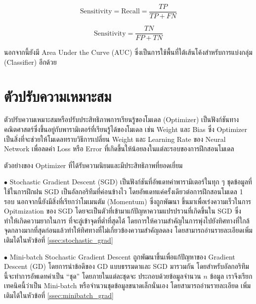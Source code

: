 \begin{equation}
    \text{Sensitivity} = \text{Recall} = \frac{TP}{TP+FN}
\end{equation}

\begin{equation}
    \text{Sensitivity} = \frac{TN}{FP+TN}
\end{equation}

\noindent นอกจากนี้ยังมี Area Under the Curve (AUC) ซึ่งเป็นการใช้พื้นที่ใต้เส้นโค้งสำหรับการแบ่งกลุ่ม (Classifier) อีกด้วย

\section{ตัวปรับความเหมาะสม}
\label{sec:optimizer}

ตัวปรับความเหมาะสมหรือปรับประสิทธิภาพการเรียนรู้ของโมเดล (Optimizer) เป็นฟังก์ชันทางคณิตศาสตร์ซึ่งขึ้นอยู่กับพารามิเตอร์ที่เรียนรู้ได้ของโมเดล 
เช่น Weight และ Bias ซึ่ง Optimizer เป็นสิ่งที่จะช่วยให้โมเดลทราบวิธีการเปลี่ยน Weight และ Learning Rate ของ Neural Network 
เพื่อลดค่า Loss หรือ Error ที่เกิดขึ้นให้น้อยลงในแต่ละรอบของการฝึกสอนโมเดล

\noindent ตัวอย่างของ Optimizer ที่ได้รับความนิยมและมีประสิทธิภาพที่ยอดเยี่ยม

\noindent $\bullet$ Stochastic Gradient Descent (SGD) เป็นฟังก์ชันที่อัพเดทค่าพารามิเตอร์ในทุก ๆ ชุดข้อมูลที่ใช้ในการฝึกฝน SGD 
เป็นอัลกอริทึมที่ค่อนข้างไว โดยอัพเดทแค่ครั้งเดียวต่อการฝึกสอนโมเดล 1 รอบ นอกจากนี้ยังมีสิ่งที่เรียกว่าโมเมนตัม (Momentum) ซึ่งถูกพัฒนา%
ขึ้นมาเพื่อเร่งความเร็วในการ Opitmization ของ SGD โดยจะเป็นตัวที่เข้ามาแก้ปัญหาความแปรปรวนที่เกิดขึ้นใน SGD ซึ่งทำให้เกิดความยากในการ%
ที่จะลู่เข้าจุดที่ต่ำที่สุดได้ โดยการให้ความสำคัญในการพุ่งไปยังทิศทางที่ใกล้จุดกลางมากที่สุดก่อนแล้วทำให้ทิศทางที่ไม่เกี่ยวข้องความสำคัญลดลง
โดยสามารถอ่านรายละเอียดเพิ่มเติมได้ในหัวข้อที่ \ref{ssec:stochastic_grad}

\noindent $\bullet$ Mini-batch Stochastic Gradient Descent ถูกพัฒนาขึ้นเพื่อแก้ปัญหาของ Gradient Descent (GD) 
โดยการนำข้อดีของ GD แบบธรรมดาและ SGD มารวมกัน โดยสำหรับอัลกอริทึมนี้จะทำการอัพเดทค่าเป็น \enquote{ชุด} โดยภายในแต่ละชุดจะ%
ประกอบด้วยข้อมูลจำนวน $n$ ข้อมูล เราจึงเรียกเทคนิคนี้ว่าเป็น Mini-batch หรือจำนวนชุดข้อมูลขนาดเล็กนั่นเอง โดยสามารถอ่านรายละเอียด%
เพิ่มเติมได้ในหัวข้อที่ \ref{ssec:minibatch_grad}

